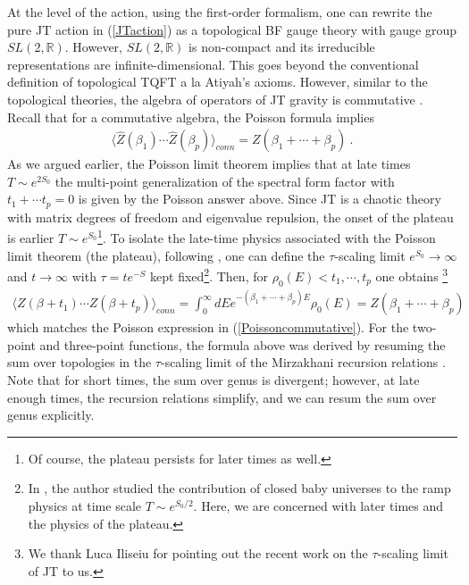 \documentclass[a4paper,11pt]{article}
\theoremstyle{definition}
\numberwithin{equation}{section}
\begin{document}
At the level of the action, using the first-order formalism, one can rewrite the pure JT action in (\ref{JTaction}) as a topological BF gauge theory with gauge group $SL(2,\mathbb{R})$. However, $SL(2,\mathbb{R})$ is non-compact and its irreducible representations are infinite-dimensional. This goes beyond the conventional definition of topological TQFT a la Atiyah's axioms. 
However, similar to the topological theories, the algebra of operators of JT gravity is commutative \cite{penington2023algebras}. Recall that for a commutative algebra, the Poisson formula implies
\begin{eqnarray}\label{Poissoncommutative}
    \langle \hat{Z}(\beta_1)\cdots \hat{Z}(\beta_p)\rangle_{conn}=Z(\beta_1+\cdots +\beta_p)\ .
\end{eqnarray}
As we argued earlier, the Poisson limit theorem implies that at late times $T\sim e^{2S_0}$ the multi-point generalization of the spectral form factor with  $t_1+\cdots t_p=0$ is given by the Poisson answer above. Since JT is a chaotic theory with matrix degrees of freedom and eigenvalue repulsion, the onset of the plateau is earlier $T\sim e^{S_0}$\footnote{Of course, the plateau persists for later times as well.}. To isolate the late-time physics associated with the Poisson limit theorem (the plateau), following \cite{okuyama2020multi,blommaert2023integrable,saad2024convergent}, one can define the $\tau$-scaling limit $e^{S_0}\to \infty$ and $t\to \infty$ with $\tau=te^{-S}$ kept fixed\footnote{In \cite{saad2019late}, the author studied the contribution of closed baby universes to the ramp physics at time scale $T\sim e^{S_0/2}$. Here, we are concerned with later times and the physics of the plateau.}. Then, for $\rho_0 (E)<t_1,\cdots, t_p$ one obtains \footnote{We thank Luca Iliseiu for pointing out the recent work on the $\tau$-scaling limit of JT to us.}
\begin{eqnarray}
    \langle Z(\beta+t_1)\cdots Z(\beta+t_p)\rangle_{conn}=\int_0^\infty dE e^{-(\beta_1+\cdots +\beta_p)E}\rho_0(E) =Z(\beta_1+\cdots +\beta_p)
\end{eqnarray}
which matches the Poisson expression in (\ref{Poissoncommutative}).
For the two-point and three-point functions, the formula above was derived by resuming the sum over topologies in the $\tau$-scaling limit of the Mirzakhani recursion relations \cite{okuyama2020multi,blommaert2021eigenbranes,blommaert2023integrable,saad2024convergent}. Note that for short times, the sum over genus is divergent; however, at late enough times, the recursion relations simplify, and we can resum the sum over genus explicitly.
\end{document}
